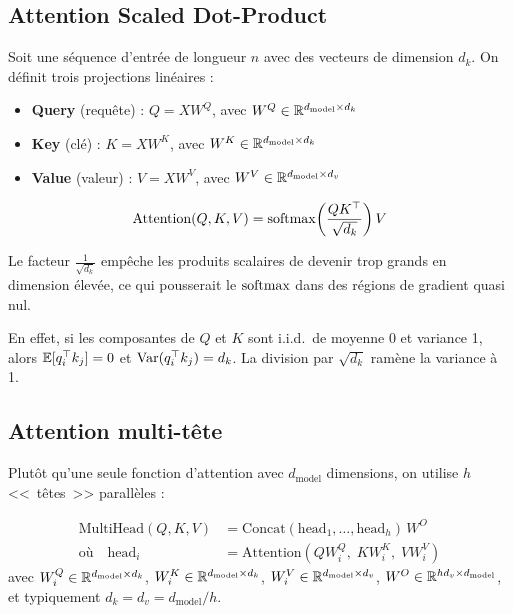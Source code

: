 \subsection{Attention Scaled Dot-Product}

Soit une s\'equence d'entr\'ee de longueur $n$ avec des vecteurs de dimension $d_k$. On d\'efinit trois projections lin\'eaires :
\begin{itemize}
    \item \textbf{Query} (requ\^ete) : $Q = XW^Q$, avec $W^Q \in \mathbb{R}^{d_{\text{model}} \times d_k}$
    \item \textbf{Key} (cl\'e) : $K = XW^K$, avec $W^K \in \mathbb{R}^{d_{\text{model}} \times d_k}$
    \item \textbf{Value} (valeur) : $V = XW^V$, avec $W^V \in \mathbb{R}^{d_{\text{model}} \times d_v}$
\end{itemize}

\begin{mathbox}[title=\textbf{Attention Scaled Dot-Product}]
\begin{equation}
\text{Attention}(Q, K, V) = \mathrm{softmax}\!\left(\frac{QK^\top}{\sqrt{d_k}}\right) V
\label{eq:scaled-attention-transformer}
\end{equation}
\end{mathbox}

\begin{intuition}
Le facteur $\frac{1}{\sqrt{d_k}}$ emp\^eche les produits scalaires de devenir trop grands en dimension \'elev\'ee, ce qui pousserait le $\mathrm{softmax}$ dans des r\'egions de gradient quasi nul.

En effet, si les composantes de $Q$ et $K$ sont i.i.d.\ de moyenne 0 et variance 1, alors $\mathbb{E}[q_i^\top k_j] = 0$ et $\mathrm{Var}(q_i^\top k_j) = d_k$. La division par $\sqrt{d_k}$ ram\`ene la variance \`a 1.
\end{intuition}

\subsection{Attention multi-t\^ete}
\label{sec:multi-head-attention}

Plut\^ot qu'une seule fonction d'attention avec $d_{\text{model}}$ dimensions, on utilise $h$ <<~t\^etes~>> parall\`eles :

\begin{formules}[title=\textbf{Attention multi-t\^ete}]
\begin{align}
\text{MultiHead}(Q, K, V) &= \text{Concat}(\text{head}_1, \ldots, \text{head}_h)\, W^O \\
\text{o\`u} \quad \text{head}_i &= \text{Attention}(QW_i^Q,\; KW_i^K,\; VW_i^V)
\end{align}
avec $W_i^Q \in \mathbb{R}^{d_{\text{model}} \times d_k}$, $W_i^K \in \mathbb{R}^{d_{\text{model}} \times d_k}$, $W_i^V \in \mathbb{R}^{d_{\text{model}} \times d_v}$, $W^O \in \mathbb{R}^{hd_v \times d_{\text{model}}}$, et typiquement $d_k = d_v = d_{\text{model}} / h$.
\end{formules}

